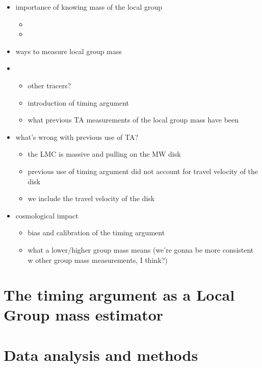\documentclass[modern]{aastex631}
\begin{document}
\begin{itemize}
    \item importance of knowing mass of the local group
    \begin{itemize}
            \item 
            \item 
          \end{itemize}
    \item ways to measure local group mass
    \item \begin{itemize}
            \item other tracers? 
            \item introduction of timing argument 
            \item what previous TA measurements of the local group mass have been
          \end{itemize}
    \item what's wrong with previous use of TA?
        \begin{itemize}
            \item the LMC is massive and pulling on the MW disk
            \item previous use of timing argument did not account for travel velocity of the disk
            \item we include the travel velocity of the disk
        \end{itemize}
    \item cosmological impact
        \begin{itemize}
            \item bias and calibration of the timing argument 
            \item what a lower/higher group mass means (we're gonna be more consistent w other group mass measurements, I think?)
        \end{itemize}
    
\end{itemize}


\section{The timing argument as a Local Group mass estimator}
\label{sec:timing}


\section{Data analysis and methods}
\label{sec:methods}
\end{document}
